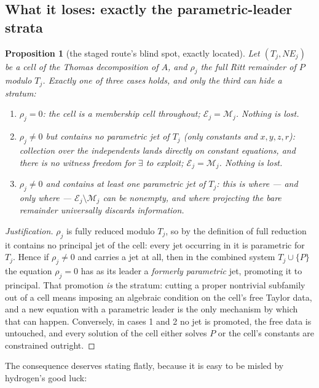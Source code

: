 \documentclass[11pt]{article}
\newcommand{\Mem}{\mathcal{M}}
\newcommand{\Ex}{\mathcal{E}}
\newtheorem{proposition}{Proposition}
\begin{document}
\subsection{What it loses: exactly the parametric-leader strata}

\begin{proposition}[the staged route's blind spot, exactly located]
\label{prop:staged-loss}
Let $(T_j,NE_j)$ be a cell of the Thomas decomposition of $A$, and $\rho_j$
the full Ritt remainder of $P$ modulo $T_j$. Exactly one of three cases holds,
and only the third can hide a stratum:
\begin{enumerate}
\item $\rho_j = 0$: the cell is a membership cell throughout;
  $\Ex_j = \Mem_j$. Nothing is lost.
\item $\rho_j \ne 0$ but contains \emph{no parametric jet} of $T_j$ (only
  constants and $x,y,z,r$): collection over the independents lands directly
  on constant equations, and there is no witness freedom for $\exists$ to
  exploit; $\Ex_j = \Mem_j$. Nothing is lost.
\item $\rho_j \ne 0$ and contains \emph{at least one parametric jet} of
  $T_j$: this is where --- and only where --- $\Ex_j \setminus \Mem_j$ can be
  nonempty, and where projecting the bare remainder universally discards
  information.
\end{enumerate}
\end{proposition}

\begin{proof}[Justification]
$\rho_j$ is fully reduced modulo $T_j$, so by the definition of full reduction
it contains no principal jet of the cell: every jet occurring in it is
parametric for $T_j$. Hence if $\rho_j \ne 0$ and carries a jet at all, then
in the combined system $T_j\cup\{P\}$ the equation $\rho_j = 0$ has as its
leader a \emph{formerly parametric} jet, promoting it to principal. That
promotion \emph{is} the stratum: cutting a proper nontrivial subfamily out of
a cell means imposing an algebraic condition on the cell's free Taylor data,
and a new equation with a parametric leader is the only mechanism by which
that can happen. Conversely, in cases 1 and 2 no jet is promoted, the free
data is untouched, and every solution of the cell either solves $P$ or the
cell's constants are constrained outright.
\end{proof}

The consequence deserves stating flatly, because it is easy to be misled by
hydrogen's good luck:
\end{document}
